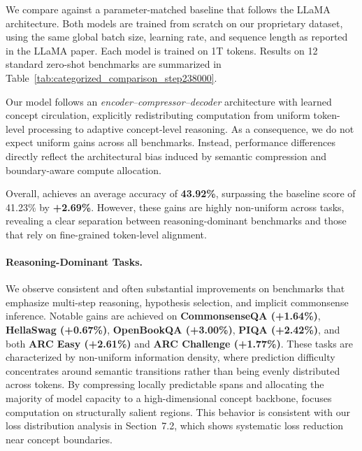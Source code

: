 We compare \ModelName{} against a parameter-matched baseline that
follows the LLaMA~\cite{touvron2023llama} architecture. Both models are
trained from scratch on our proprietary dataset, using the same global
batch size, learning rate, and sequence length as reported in the LLaMA
paper. Each model is trained on 1T tokens. Results on 12 standard
zero-shot benchmarks are summarized in
Table~\ref{tab:categorized_comparison_step238000}.


Our model follows an \emph{encoder--compressor--decoder} architecture with learned concept circulation, explicitly redistributing computation from uniform token-level processing to adaptive concept-level reasoning.
As a consequence, we do not expect uniform gains across all benchmarks.
Instead, performance differences directly reflect the architectural bias induced by semantic compression and boundary-aware compute allocation.

Overall, \ModelName{} achieves an average accuracy of \textbf{43.92\%}, surpassing the baseline score of 41.23\% by \textbf{+2.69\%}.
However, these gains are highly non-uniform across tasks, revealing a clear separation between reasoning-dominant benchmarks and those that rely on fine-grained token-level alignment.

\paragraph{Reasoning-Dominant Tasks.}
We observe consistent and often substantial improvements on benchmarks that emphasize multi-step reasoning, hypothesis selection, and implicit commonsense inference.
Notable gains are achieved on \textbf{CommonsenseQA (+1.64\%)}, \textbf{HellaSwag (+0.67\%)}, \textbf{OpenBookQA (+3.00\%)}, \textbf{PIQA (+2.42\%)}, and both \textbf{ARC Easy (+2.61\%)} and \textbf{ARC Challenge (+1.77\%)}.
These tasks are characterized by non-uniform information density, where prediction difficulty concentrates around semantic transitions rather than being evenly distributed across tokens.
By compressing locally predictable spans and allocating the majority of model capacity to a high-dimensional concept backbone, \ModelName{} focuses computation on structurally salient regions.
This behavior is consistent with our loss distribution analysis in Section~7.2, which shows systematic loss reduction near concept boundaries.

